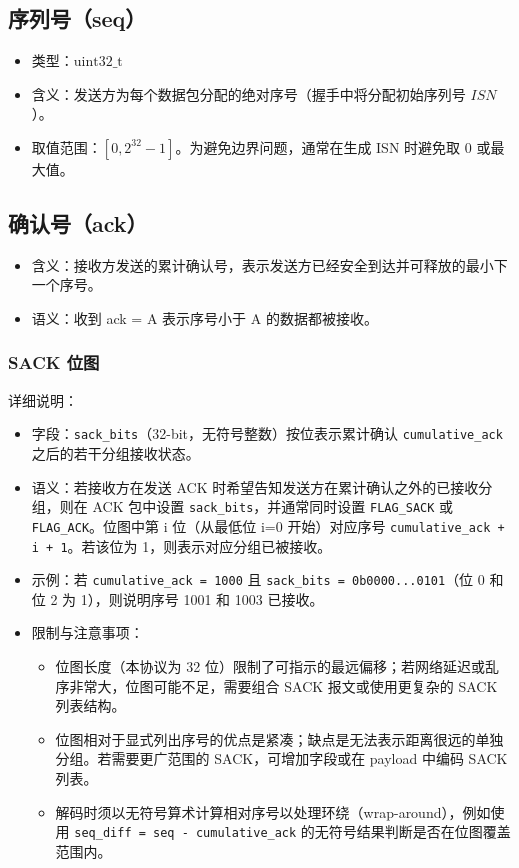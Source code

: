 \documentclass[11pt,a4paper]{article}
\begin{document}
\subsection{序列号（seq）}
\begin{itemize}
  \item 类型：\(\text{uint32\_t}\)
  \item 含义：发送方为每个数据包分配的绝对序号（握手中将分配初始序列号 \(ISN\)）。
  \item 取值范围：\([0,2^{32}-1]\)。为避免边界问题，通常在生成 ISN 时避免取 0 或最大值。
\end{itemize}

\subsection{确认号（ack）}
\begin{itemize}
  \item 含义：接收方发送的累计确认号，表示发送方已经安全到达并可释放的最小下一个序号。
  \item 语义：收到 ack = A 表示序号小于 A 的数据都被接收。
\end{itemize}

\subsubsection{SACK 位图}
详细说明：
\begin{itemize}
  \item 字段：\texttt{sack\_bits}（32-bit，无符号整数）按位表示累计确认 \texttt{cumulative\_ack} 之后的若干分组接收状态。
  \item 语义：若接收方在发送 ACK 时希望告知发送方在累计确认之外的已接收分组，则在 ACK 包中设置 \texttt{sack\_bits}，并通常同时设置 \texttt{FLAG\_SACK} 或 \texttt{FLAG\_ACK}。位图中第 i 位（从最低位 i=0 开始）对应序号 \texttt{cumulative\_ack + i + 1}。若该位为 1，则表示对应分组已被接收。
  \item 示例：若 \texttt{cumulative\_ack = 1000} 且 \texttt{sack\_bits = 0b0000...0101}（位 0 和位 2 为 1），则说明序号 1001 和 1003 已接收。
  \item 限制与注意事项：
    \begin{itemize}
      \item 位图长度（本协议为 32 位）限制了可指示的最远偏移；若网络延迟或乱序非常大，位图可能不足，需要组合 SACK 报文或使用更复杂的 SACK 列表结构。
      \item 位图相对于显式列出序号的优点是紧凑；缺点是无法表示距离很远的单独分组。若需要更广范围的 SACK，可增加字段或在 payload 中编码 SACK 列表。
      \item 解码时须以无符号算术计算相对序号以处理环绕（wrap-around），例如使用 \texttt{seq\_diff = seq - cumulative\_ack} 的无符号结果判断是否在位图覆盖范围内。
    \end{itemize}
\end{itemize}
\end{document}
